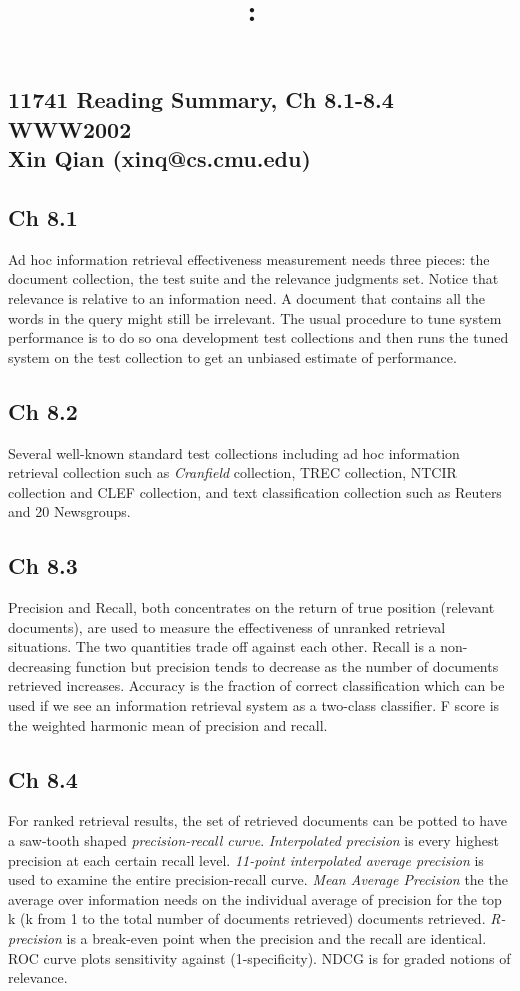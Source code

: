 \documentclass[9pt]{article}
\title{
\textmd{\textbf{\hmwkClass:\ \hmwkTitle}
}}
\author{\textbf{\hmwkAuthorName}}
\begin{document}
\subsection{11741 Reading Summary, Ch 8.1-8.4 WWW2002 \\Xin Qian (xinq@cs.cmu.edu)}
\subsection{Ch 8.1}
Ad hoc information retrieval effectiveness measurement needs three pieces: the document collection, the test suite and the relevance judgments set. Notice that relevance is relative to an information need. A document that contains all the words in the query might still be irrelevant. The usual procedure to tune system performance is to do so ona development test collections and then runs the tuned system on the test collection to get an unbiased estimate of performance. 
\subsection{Ch 8.2}
Several well-known standard test collections including ad hoc information retrieval collection such as \textit{Cranfield} collection, TREC collection, NTCIR collection and CLEF collection, and text classification collection such as Reuters and 20 Newsgroups. 
\subsection{Ch 8.3}
Precision and Recall, both concentrates on the return of true position (relevant documents), are used to measure the effectiveness of unranked retrieval situations. The two quantities trade off against each other. Recall is a non-decreasing function but precision tends to decrease as the number of documents retrieved increases. Accuracy is the fraction of correct classification which can be used if we see an information retrieval system as a two-class classifier. F score is the weighted harmonic mean of precision and recall. 
\subsection{Ch 8.4}
For ranked retrieval results, the set of retrieved documents can be potted to have a saw-tooth shaped \textit{precision-recall curve}. \textit{Interpolated precision} is every highest precision at each certain recall level. \textit{11-point interpolated average precision} is used to examine the entire precision-recall curve. \textit{Mean Average Precision} the the average over information needs on the individual average of precision for the top k (k from 1 to the total number of documents retrieved) documents retrieved. \textit{R-precision} is a break-even point when the precision and the recall are identical. ROC curve plots sensitivity against (1-specificity). NDCG is for graded notions of relevance. 
\end{document}
